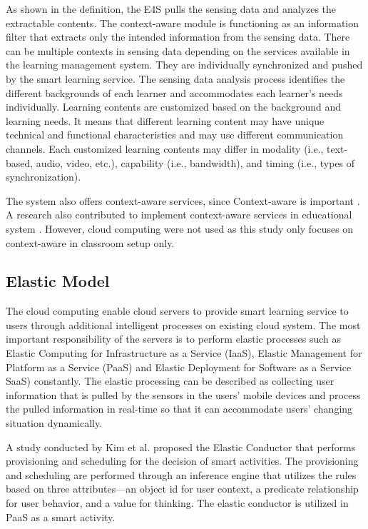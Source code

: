 \documentclass[journal]{vgtc}                %
\begin{document}
  As shown in the definition, the E4S pulls the sensing data and analyzes the extractable contents. The context-aware module is functioning as an information filter that extracts only the intended information from the sensing data. There can be multiple contexts in sensing data depending on the services available in the learning management system. They are individually synchronized and pushed by the smart learning service. The sensing data analysis process identifies the different backgrounds of each learner and accommodates each learner’s needs individually. Learning contents are customized based on the background and learning needs. It means that different learning content may have unique technical and functional characteristics and may use different communication channels. Each customized learning contents may differ in modality (i.e., text-based, audio, video, etc.), capability (i.e., bandwidth), and timing (i.e., types of synchronization).

  The system also offers context-aware services, since Context-aware is important \cite{Pratama2014}. A research also contributed to implement context-aware services in educational system \cite{Scott2010}. However, cloud computing were not used as this study only focuses on context-aware in classroom setup only.

  \subsection{Elastic Model}
  The cloud computing enable cloud servers to provide smart learning service to users through additional intelligent processes on existing cloud system. The most important responsibility of the servers is to perform elastic processes such as Elastic Computing for Infrastructure as a Service (IaaS), Elastic Management for Platform as a Service (PaaS) and Elastic Deployment for Software as a Service SaaS) constantly. The elastic processing can be described as collecting user information that is pulled by the sensors in the users' mobile devices and process the pulled information in real-time so that it can accommodate users' changing situation dynamically.

  A study conducted by Kim et al. \cite{Kim2013} proposed the Elastic Conductor that performs provisioning and scheduling for the decision of smart activities. The provisioning and scheduling are performed through an inference engine that utilizes the rules based on three attributes—an object id for user context, a predicate relationship for user behavior, and a value for thinking. The elastic conductor is utilized in PaaS as a smart activity.
  
\end{document}
